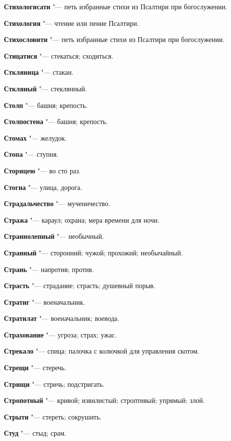\begin{mymulticols}
\noindent\textbf{Стихологисати} "--- петь избранные стихи из Псалтири при богослужении. 

\noindent\textbf{Стихология} "--- чтение или пение Псалтири. 

\noindent\textbf{Стихословити} "--- петь избранные стихи из Псалтири при богослужении. 

\noindent\textbf{Стицатися} "--- стекаться; сходиться. 

\noindent\textbf{Сткляница} "--- стакан. 

\noindent\textbf{Сткляный} "--- стеклянный. 

\noindent\textbf{Столп} "--- башня; крепость. 

\noindent\textbf{Столпостена} "--- башня; крепость. 

\noindent\textbf{Стомах} "--- желудок. 

\noindent\textbf{Стопа} "--- ступня. 

\noindent\textbf{Сторицею} "--- во сто раз. 

\noindent\textbf{Стогна} "--- улица, дорога. 

\noindent\textbf{Страдальчество} "--- мученичество. 

\noindent\textbf{Стража} "--- караул; охрана; мера времени для ночи. 

\noindent\textbf{Страннолепный} "--- необычный. 

\noindent\textbf{Странный} "--- сторонний; чужой; прохожий; необычайный. 

\noindent\textbf{Странь} "--- напротив; против. 

\noindent\textbf{Страсть} "--- страдание; страсть; душевный порыв. 

\noindent\textbf{Стратиг} "--- военачальник. 

\noindent\textbf{Стратилат} "--- военачальник; воевода. 

\noindent\textbf{Страхование} "--- угроза; страх; ужас. 

\noindent\textbf{Стрекало} "--- спица; палочка с колючкой для управления скотом. 

\noindent\textbf{Стрещи} "--- стеречь. 

\noindent\textbf{Стрищи} "--- стричь; подстригать. 

\noindent\textbf{Стропотный} "--- кривой; извилистый; строптивый; упрямый; злой. 

\noindent\textbf{Стрыти} "--- стереть; сокрушить. 

\noindent\textbf{Студ} "--- стыд; срам. 


\end{mymulticols}
